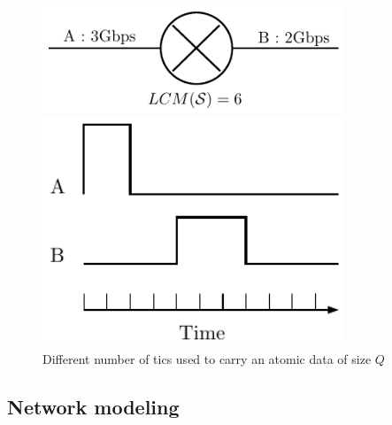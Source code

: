 \documentclass[10pt]{article}
\begin{document}
  \begin{center}
  
  \begin{figure}
  \begin{minipage}[b]{0.50\linewidth}
  \includegraphics[width=0.8\textwidth]{links.pdf}
  \end{minipage}
\hfill
  \begin{minipage}[b]{0.50\linewidth}
    \includegraphics[width=0.8\textwidth]{chronotics.pdf}
  \end{minipage} 
  \caption{Different number of tics used to carry an atomic data of size $Q$}
  \label{fig:datagram}
 \end{figure}
 
    \end{center}
  \subsection{Network modeling}
  
\end{document}
